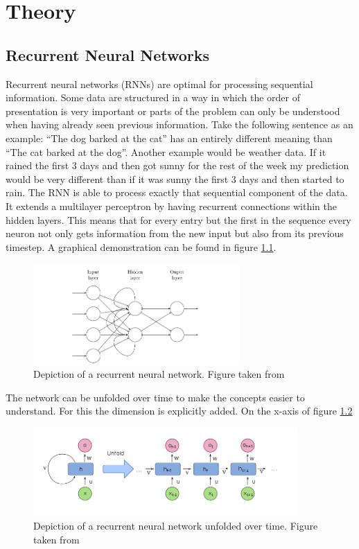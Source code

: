 \chapter{Theory}
\label{chap:theory}

\section{Recurrent Neural Networks}

Recurrent neural networks (RNNs) are optimal for processing sequential information. Some data are structured in a way in which the order of presentation is very important or parts of the problem can only be understood when having already seen previous information. Take the following sentence as an example: ``The dog barked at the cat'' has an entirely different meaning than ``The cat barked at the dog''. Another example would be weather data. If it rained the first 3 days and then got sunny for the rest of the week my prediction would be very different than if it was sunny the first 3 days and then started to rain. The RNN is able to process exactly that sequential component of the data. It extends a multilayer perceptron 
\cite{Rosenblatt58theperceptron:} by having recurrent connections within the hidden layers. This means that for every entry but the first in the sequence every neuron not only gets information from the new input but also from its previous timestep. A graphical demonstration can be found in figure \ref{fig:RNN}.

\begin{figure}[!htb]
	\centering
	\includegraphics[width=0.7\textwidth]{images/RNN.png}
	\caption{Depiction of a recurrent neural network. Figure taken from \protect\footnotemark}
	\label{fig:RNN}
\end{figure}

The network can be unfolded over time to make the concepts easier to understand. For this the dimension is explicitly added. On the x-axis of figure \ref{fig:unfolded_RNN} 

\begin{figure}[!htb]
	\includegraphics[width=0.9\textwidth]{images/unfolded_RNN.png}
	\caption{Depiction of a recurrent neural network unfolded over time. Figure taken from \protect\footnotemark}
	\label{fig:unfolded_RNN}
\end{figure}


